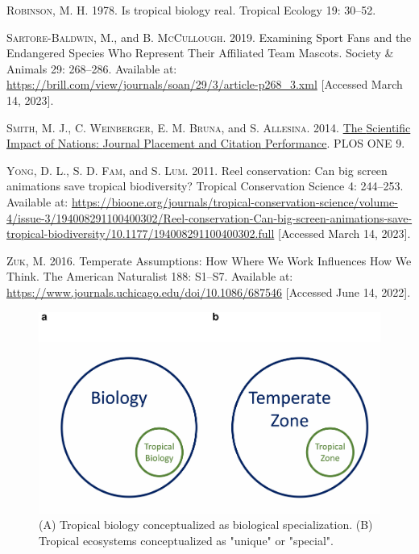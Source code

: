 \documentclass[
  12pt,
  man, donotrepeattitle]{apa6}
\newlength{\cslhangindent}
\newlength{\cslentryspacingunit} %
\newenvironment{CSLReferences}[2] %
 {%
  \setlength{\parindent}{0pt}
  \ifodd #1
  \let\oldpar\par
  \def\par{\hangindent=\cslhangindent\oldpar}
  \fi
  \setlength{\parskip}{#2\cslentryspacingunit}
 }%
 {}
\begin{document}
\begin{CSLReferences}{1}{0}
\leavevmode{}%
\textsc{Robinson, M. H.} 1978. Is tropical biology real. Tropical Ecology 19: 30--52.

\leavevmode{}%
\textsc{Sartore-Baldwin, M.}, and \textsc{B. McCullough}. 2019. Examining {Sport} {Fans} and the {Endangered} {Species} {Who} {Represent} {Their} {Affiliated} {Team} {Mascots}. Society \& Animals 29: 268--286. Available at: \url{https://brill.com/view/journals/soan/29/3/article-p268_3.xml} {[}Accessed March 14, 2023{]}.

\leavevmode{}%
\textsc{Smith, M. J.}, \textsc{C. Weinberger}, \textsc{E. M. Bruna}, and \textsc{S. Allesina}. 2014. \href{https://doi.org/10.1371/journal.pone.0109195}{The {Scientific} {Impact} of {Nations}: {Journal} {Placement} and {Citation} {Performance}}. PLOS ONE 9.

\leavevmode{}%
\textsc{Yong, D. L.}, \textsc{S. D. Fam}, and \textsc{S. Lum}. 2011. Reel conservation: {Can} big screen animations save tropical biodiversity? Tropical Conservation Science 4: 244--253. Available at: \url{https://bioone.org/journals/tropical-conservation-science/volume-4/issue-3/194008291100400302/Reel-conservation-Can-big-screen-animations-save-tropical-biodiversity/10.1177/194008291100400302.full} {[}Accessed March 14, 2023{]}.

\leavevmode{}%
\textsc{Zuk, M.} 2016. Temperate {Assumptions}: {How} {Where} {We} {Work} {Influences} {How} {We} {Think}. The American Naturalist 188: S1--S7. Available at: \url{https://www.journals.uchicago.edu/doi/10.1086/687546} {[}Accessed June 14, 2022{]}.

\end{CSLReferences}

\begin{figure}[H]

{\centering \includegraphics[width=1\linewidth,]{Bruna_plenary_MS_files/figure-latex/fig1-1} 

}

\caption{(A) Tropical biology conceptualized as biological specialization. (B) Tropical ecosystems conceptualized as "unique" or "special".}\label{fig:fig1}
\end{figure}
\end{document}
